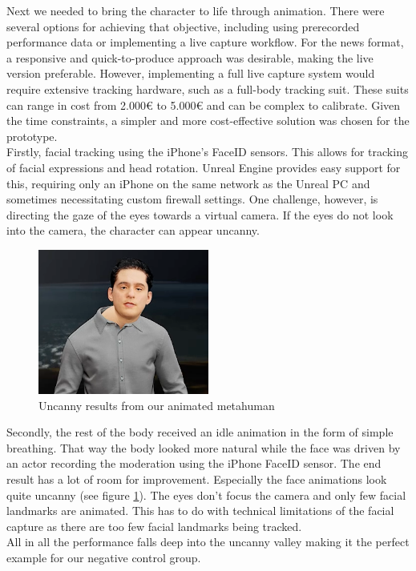 \documentclass[
  a4paper,  %
  twoside,  %
  bibliography=totoc,
  headsepline,
  cleardoublepage=empty,
  parskip=half,
  draft=false
]{scrbook}
\begin{document}
Next we needed to bring the character to life through animation. There were several options for achieving that objective, including using prerecorded performance data or implementing a live capture workflow. For the news format, a responsive and quick-to-produce approach was desirable, making the live version preferable. However, implementing a full live capture system would require extensive tracking hardware, such as a full-body tracking suit. These suits can range in cost from 2.000€ to 5.000€ and can be complex to calibrate. Given the time constraints, a simpler and more cost-effective solution was chosen for the prototype. \\
Firstly, facial tracking using the iPhone's FaceID sensors. This allows for tracking of facial expressions and head rotation. Unreal Engine provides easy support for this, requiring only an iPhone on the same network as the Unreal PC and sometimes necessitating custom firewall settings. One challenge, however, is directing the gaze of the eyes towards a virtual camera. If the eyes do not look into the camera, the character can appear uncanny.
\begin{figure}[h]
  \centering
  \includegraphics[width=0.5\textwidth]{graphics/images/unreal-engine/MH/bent-head.png}
  \caption{Uncanny results from our animated metahuman}
  \label{fig:uncanny mh}
\end{figure}
Secondly, the rest of the body received an idle animation in the form of simple breathing. That way the body looked more natural while the face was driven by an actor recording the moderation using the iPhone FaceID sensor. The end result has a lot of room for improvement. Especially the face animations look quite uncanny (see figure \ref{fig:uncanny mh}). The eyes don't focus the camera and only few facial landmarks are animated. This has to do with technical limitations of the facial capture as there are too few facial landmarks being tracked. \\
All in all the performance falls deep into the uncanny valley making it the perfect example for our negative control group. 
\end{document}
